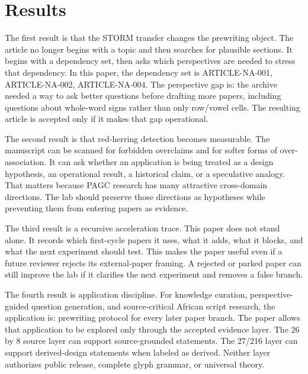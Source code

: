 \documentclass[sigconf,nonacm]{acmart}
\begin{document}
\section{Results}
The first result is that the STORM transfer changes the prewriting object. The
article no longer begins with a topic and then searches for plausible sections.
It begins with a dependency set, then asks which perspectives are needed to
stress that dependency. In this paper, the dependency set is ARTICLE-NA-001, ARTICLE-NA-002, ARTICLE-NA-004. The
perspective gap is: the archive needed a way to ask better questions before drafting more papers, including questions about whole-word signs rather than only row/vowel cells. The resulting article is accepted only if it makes
that gap operational.

The second result is that red-herring detection becomes measurable. The
manuscript can be scanned for forbidden overclaims and for softer forms of
over-association. It can ask whether an application is being treated as a design
hypothesis, an operational result, a historical claim, or a speculative analogy.
That matters because PAGC research has many attractive cross-domain directions.
The lab should preserve those directions as hypotheses while preventing them
from entering papers as evidence.

The third result is a recursive acceleration trace. This paper does not stand
alone. It records which first-cycle papers it uses, what it adds, what it blocks,
and what the next experiment should test. This makes the paper useful even if a
future reviewer rejects its external-paper framing. A rejected or parked paper
can still improve the lab if it clarifies the next experiment and removes a
false branch.

The fourth result is application discipline. For knowledge curation, perspective-guided question generation, and source-critical African script research, the application is:
prewriting protocol for every later paper branch. The paper allows that application to be explored only through the
accepted evidence layer. The 26 by 8 source layer can support source-grounded
statements. The 27/216 layer can support derived-design statements when labeled
as derived. Neither layer authorizes public release, complete glyph grammar, or
universal theory.
\end{document}
